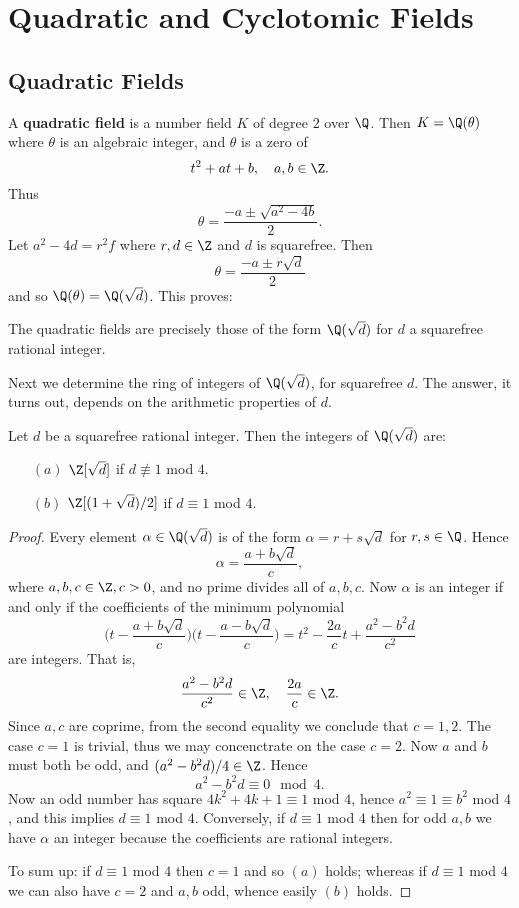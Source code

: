 \section{Quadratic and Cyclotomic Fields}
\subsection{Quadratic Fields}
A \textbf{quadratic field} is a number field $K$ of degree $2$ over $\Q$. Then $K=\Q(\theta)$ where $\theta$ is an algebraic integer, and $\theta$ is a zero of
\[t^2+at+b,\quad a,b\in\Z.\]
Thus
\[\theta=\frac{-a\pm\sqrt{a^2-4b}}{2}.\]
Let $a^2-4d=r^2f$ where $r,d\in\Z$ and $d$ is squarefree. Then
\[\theta=\frac{-a\pm r\sqrt{d}}{2}\]
and so $\Q(\theta)=\Q(\sqrt{d})$. This proves:
\begin{proposition}
The quadratic fields are precisely those of the form $\Q(\sqrt{d})$ for $d$ a squarefree rational integer.
\end{proposition}
Next we determine the ring of integers of $\Q(\sqrt{d})$, for squarefree $d$. The answer, it turns out, depends on the arithmetic properties of $d$.
\begin{theorem}\label{int ring quadratic}
Let $d$ be a squarefree rational integer. Then the integers of $\Q(\sqrt{d})$ are:
\begin{itemize}
\item[$(a)$] $\Z[\sqrt{d}]$ if $d\not\equiv 1$ mod $4$.
\item[$(b)$] $\Z[(1+\sqrt{d})/2]$ if $d\equiv 1$ mod $4$.
\end{itemize}
\end{theorem}
\begin{proof}
Every element $\alpha\in\Q(\sqrt{d})$ is of the form $\alpha=r+s\sqrt{d}$ for $r,s\in\Q$. Hence
\[\alpha=\frac{a+b\sqrt{d}}{c},\]
where $a,b,c\in\Z,c>0$, and no prime divides all of $a,b,c$. Now $\alpha$ is an integer if and only if the coefficients of the minimum polynomial
\[\Big(t-\frac{a+b\sqrt{d}}{c}\Big)\Big(t-\frac{a-b\sqrt{d}}{c}\Big)=t^2-\frac{2a}{c}t+\frac{a^2-b^2d}{c^2}\]
are integers. That is,
\[\frac{a^2-b^2d}{c^2}\in\Z,\quad \frac{2a}{c}\in\Z.\]
Since $a,c$ are coprime, from the second equality we conclude that $c=1,2$. The case $c=1$ is trivial, thus we may concenctrate on the case $c=2$. Now $a$ and $b$ must both be odd, and $(a^2-b^2d)/4\in\Z$. Hence
\[a^2-b^2d\equiv0\mod 4.\]
Now an odd number has square $4k^2+4k+1\equiv 1$ mod $4$, hence $a^2\equiv1\equiv b^2$ mod $4$, and this implies $d\equiv1$ mod $4$. Conversely, if $d\equiv1$ mod $4$ then for odd $a,b$ we have $\alpha$ an integer because the coefficients are rational integers.\par
To sum up: if $d\equiv1$ mod $4$ then $c=1$ and so $(a)$ holds; whereas if $d\equiv1$ mod $4$ we can also have $c=2$ and $a,b$ odd, whence easily $(b)$ holds.
\end{proof}

